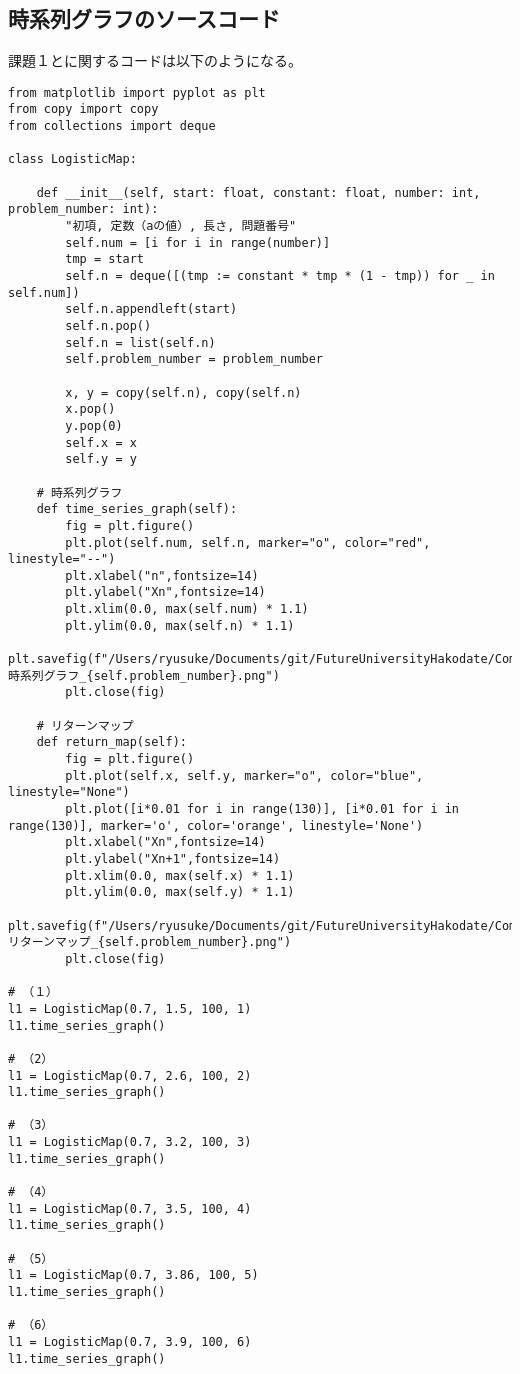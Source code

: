 \documentclass[a4j]{jsarticle}
\begin{document}
\newpage

\subsection{時系列グラフのソースコード}

課題１とに関するコードは以下のようになる。

\begin{lstlisting}[caption=Pythonによる時系列グラフの描画]
from matplotlib import pyplot as plt
from copy import copy
from collections import deque

class LogisticMap:

    def __init__(self, start: float, constant: float, number: int, problem_number: int):
        "初項, 定数（aの値）, 長さ, 問題番号"
        self.num = [i for i in range(number)]
        tmp = start
        self.n = deque([(tmp := constant * tmp * (1 - tmp)) for _ in self.num])
        self.n.appendleft(start)
        self.n.pop()
        self.n = list(self.n)
        self.problem_number = problem_number

        x, y = copy(self.n), copy(self.n)
        x.pop()
        y.pop(0)
        self.x = x
        self.y = y

    # 時系列グラフ
    def time_series_graph(self):
        fig = plt.figure()
        plt.plot(self.num, self.n, marker="o", color="red", linestyle="--")
        plt.xlabel("n",fontsize=14)
        plt.ylabel("Xn",fontsize=14)
        plt.xlim(0.0, max(self.num) * 1.1)
        plt.ylim(0.0, max(self.n) * 1.1)
        plt.savefig(f"/Users/ryusuke/Documents/git/FutureUniversityHakodate/ComplexScienceExercise/result/week01_時系列グラフ_{self.problem_number}.png")
        plt.close(fig)

    # リターンマップ
    def return_map(self):
        fig = plt.figure()
        plt.plot(self.x, self.y, marker="o", color="blue", linestyle="None")
        plt.plot([i*0.01 for i in range(130)], [i*0.01 for i in range(130)], marker='o', color='orange', linestyle='None')
        plt.xlabel("Xn",fontsize=14)
        plt.ylabel("Xn+1",fontsize=14)
        plt.xlim(0.0, max(self.x) * 1.1)
        plt.ylim(0.0, max(self.y) * 1.1)
        plt.savefig(f"/Users/ryusuke/Documents/git/FutureUniversityHakodate/ComplexScienceExercise/result/week01_リターンマップ_{self.problem_number}.png")
        plt.close(fig)

# （１）
l1 = LogisticMap(0.7, 1.5, 100, 1)
l1.time_series_graph()

# （2）
l1 = LogisticMap(0.7, 2.6, 100, 2)
l1.time_series_graph()

# （3）
l1 = LogisticMap(0.7, 3.2, 100, 3)
l1.time_series_graph()

# （4）
l1 = LogisticMap(0.7, 3.5, 100, 4)
l1.time_series_graph()

# （5）
l1 = LogisticMap(0.7, 3.86, 100, 5)
l1.time_series_graph()

# （6）
l1 = LogisticMap(0.7, 3.9, 100, 6)
l1.time_series_graph()
\end{lstlisting}
\end{document}
